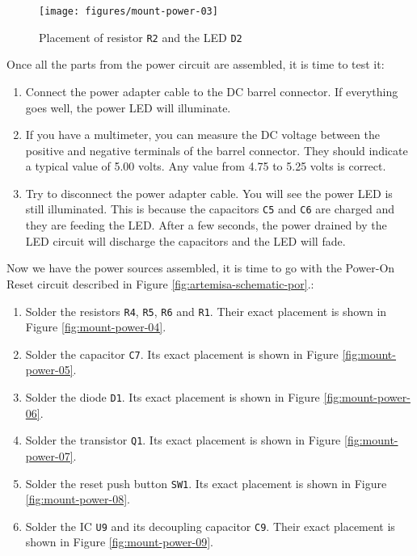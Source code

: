 \begin{figure}[h]
  \centering
  \texttt{[image: figures/mount-power-03]}
  \caption{Placement of resistor {\tt R2} and the LED {\tt D2}}
  \label{fig:mount-power-03}
\end{figure}

Once all the parts from the power circuit are assembled, it is time to test it:

\begin{enumerate}
  \item Connect the power adapter cable to the DC barrel connector. If everything goes well, the power LED will illuminate.
  \item If you have a multimeter, you can measure the DC voltage between the positive and negative terminals of the barrel connector. They should indicate a typical value of 5.00 volts. Any value from 4.75 to 5.25 volts is correct.
  \item Try to disconnect the power adapter cable. You will see the power LED is still illuminated. This is because the capacitors {\tt C5} and {\tt C6} are charged and they are feeding the LED. After a few seconds, the power drained by the LED circuit will discharge the capacitors and the LED will fade.
\end{enumerate}

Now we have the power sources assembled, it is time to go with the Power-On Reset circuit described in Figure \ref{fig:artemisa-schematic-por}.:

\begin{enumerate}
  \item Solder the resistors {\tt R4}, {\tt R5}, {\tt R6} and {\tt R1}. Their exact placement is shown in Figure \ref{fig:mount-power-04}.
  \item Solder the capacitor {\tt C7}. Its exact placement is shown in Figure \ref{fig:mount-power-05}.
  \item Solder the diode {\tt D1}. Its exact placement is shown in Figure \ref{fig:mount-power-06}.
  \item Solder the transistor {\tt Q1}. Its exact placement is shown in Figure \ref{fig:mount-power-07}.
  \item Solder the reset push button {\tt SW1}. Its exact placement is shown in Figure \ref{fig:mount-power-08}.
  \item Solder the IC {\tt U9} and its decoupling capacitor {\tt C9}. Their exact placement is shown in Figure \ref{fig:mount-power-09}.
\end{enumerate}

